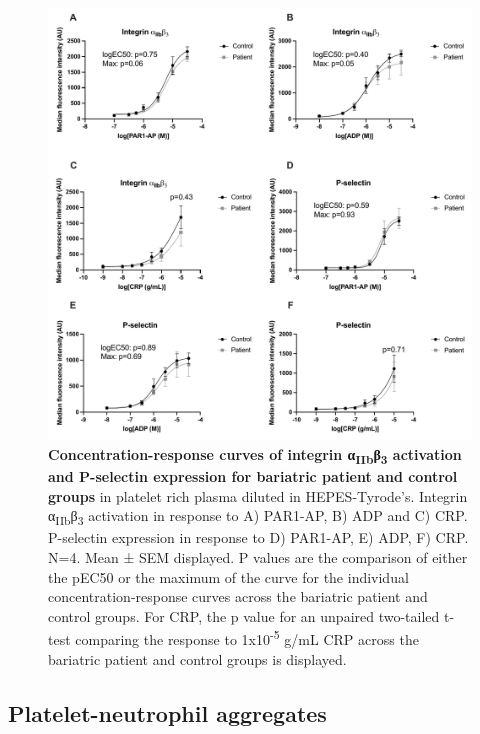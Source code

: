 \documentclass[11pt,twoside]{bristolthesis}
\begin{document}
\begin{figure}
\includegraphics[width=0.9\linewidth]{figure/Bariatric_study/Agonist_Integrin_Pselectin} \caption[Concentration-response curves of integrin α\textsubscript{IIb}β\textsubscript{3} activation and P-selectin expression for bariatric patient and control groups]{\textbf{Concentration-response curves of integrin α\textsubscript{IIb}β\textsubscript{3} activation and P-selectin expression for bariatric patient and control groups} in platelet rich plasma diluted in HEPES-Tyrode's. Integrin α\textsubscript{IIb}β\textsubscript{3} activation in response to A) PAR1-AP, B) ADP and C) CRP. P-selectin expression in response to D) PAR1-AP, E) ADP, F) CRP. N=4. Mean ± SEM displayed. P values are the comparison of either the pEC50 or the maximum of the curve for the individual concentration-response curves across the bariatric patient and control groups. For CRP, the p value for an unpaired two-tailed t-test comparing the response to 1x10\textsuperscript{-5} g/mL CRP across the bariatric patient and control groups is displayed.}\label{fig:agonist-integrin-pselectin}
\end{figure}
\hypertarget{platelet-neutrophil-aggregates}{%
\subsection{Platelet-neutrophil aggregates}\label{platelet-neutrophil-aggregates}}
\end{document}

